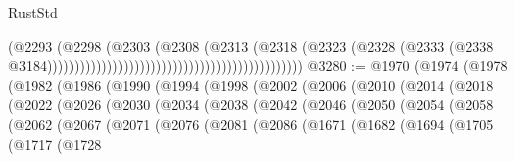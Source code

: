 \begin{lexlean}{RustStd}
\begin{coremodule}
                                                                              (@2293
                                                                                (@2298
                                                                                  (@2303
                                                                                    (@2308
                                                                                      (@2313
                                                                                        (@2318
                                                                                          (@2323
                                                                                            (@2328
                                                                                              (@2333
                                                                                                (@2338
                                                                                                  @3184)))))))))))))))))))))))))))))))))))))))))))))))
@3280 := @1970
    (@1974
      (@1978
        (@1982
          (@1986
            (@1990
              (@1994
                (@1998
                  (@2002
                    (@2006
                      (@2010
                        (@2014
                          (@2018
                            (@2022
                              (@2026
                                (@2030
                                  (@2034
                                    (@2038
                                      (@2042
                                        (@2046
                                          (@2050
                                            (@2054
                                              (@2058
                                                (@2062
                                                  (@2067
                                                    (@2071
                                                      (@2076
                                                        (@2081
                                                          (@2086
                                                            (@1671
                                                              (@1682
                                                                (@1694
                                                                  (@1705
                                                                    (@1717
                                                                      (@1728

\end{coremodule}
\end{lexlean}
